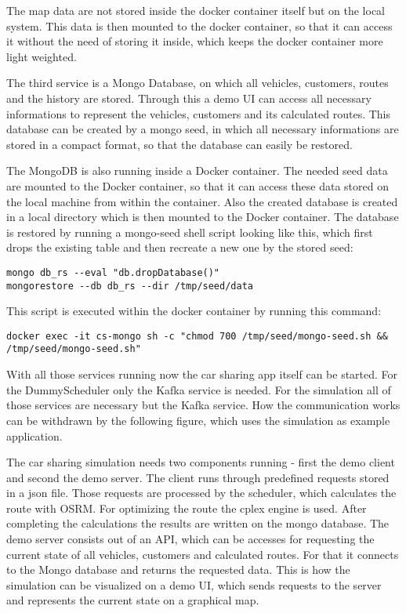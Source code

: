 The map data are not stored inside the docker container itself but on the local system. This data is then mounted to the docker container, so that it can access it without the need of storing it inside, which keeps the docker container more light weighted.

The third service is a Mongo Database, on which all vehicles, customers, routes and the history are stored. Through this a demo UI can access all necessary informations to represent the vehicles, customers and its calculated routes. This database can be created by a mongo seed, in which all necessary informations are stored in a compact format, so that the database can easily be restored. 

The MongoDB is also running inside a Docker container. The needed seed data are mounted to the Docker container, so that it can access these data stored on the local machine from within the container. Also the created database is created in a local directory which is then mounted to the Docker container. The database is restored by running a mongo-seed shell script looking like this, which first drops the existing table and then recreate a new one by the stored seed:


\begin{lstlisting}
mongo db_rs --eval "db.dropDatabase()"
mongorestore --db db_rs --dir /tmp/seed/data
\end{lstlisting}

This script is executed within the docker container by running this command:

\begin{lstlisting}
docker exec -it cs-mongo sh -c "chmod 700 /tmp/seed/mongo-seed.sh && /tmp/seed/mongo-seed.sh"
\end{lstlisting}

With all those services running now the car sharing app itself can be started. For the DummyScheduler only the Kafka service is needed. For the simulation all of those services are necessary but the Kafka service. How the communication works can be withdrawn by the following figure, which uses the simulation as example application.


The car sharing simulation needs two components running - first the demo client and second the demo server. The client runs through predefined requests stored in a json file. Those requests are processed by the scheduler, which calculates the route with OSRM. For optimizing the route the cplex engine is used. After completing the calculations the results are written on the mongo database. The demo server consists out of an API, which can be accesses for requesting the current state of all vehicles, customers and calculated routes. For that it connects to the Mongo database and returns the requested data. This is how the simulation can be visualized on a demo UI, which sends requests to the server and represents the current state on a graphical map.


